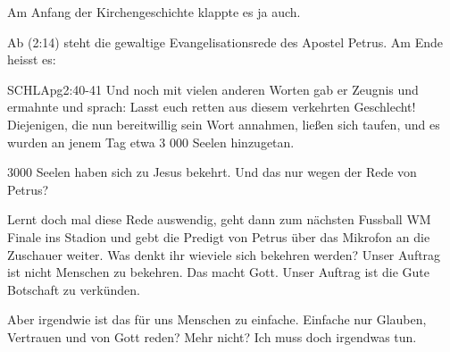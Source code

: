 \documentclass[14pt]{../../inc/mybib}
\newenvironment{block}[1][]{%
  \vspace{1.5em}%
  \noindent\textbf{#1}\par%
  \vspace{0.0em}%
}{%
  \vspace{1em}%
}
\begin{document}
    Am Anfang der Kirchengeschichte klappte es ja auch.
\begin{block}
    Ab (2:14) steht die gewaltige Evangelisationsrede des Apostel Petrus. Am Ende heisst es:
    \begin{bibelbox}{SCHL}{Apg}{2:40-41}
        Und noch mit vielen anderen Worten gab er Zeugnis und ermahnte und sprach: Lasst euch retten aus diesem verkehrten Geschlecht! Diejenigen, die nun bereitwillig sein Wort annahmen, ließen sich taufen, und es wurden an jenem Tag etwa 3 000 Seelen hinzugetan.
    \end{bibelbox} 
    3000 Seelen haben sich zu Jesus bekehrt. Und das nur wegen der Rede von Petrus?
    
    Lernt doch mal diese Rede auswendig, geht dann zum nächsten Fussball WM Finale ins Stadion und gebt die Predigt von Petrus über das Mikrofon an die Zuschauer weiter. Was denkt ihr wieviele sich bekehren werden? Unser Auftrag ist nicht Menschen zu bekehren. Das macht Gott. Unser Auftrag ist die Gute Botschaft zu verkünden.
\end{block}
\begin{block}
    Aber irgendwie ist das für uns Menschen zu einfache. Einfache nur Glauben, Vertrauen und von Gott reden? Mehr nicht? Ich muss doch irgendwas tun.
\end{block}
\end{document}
